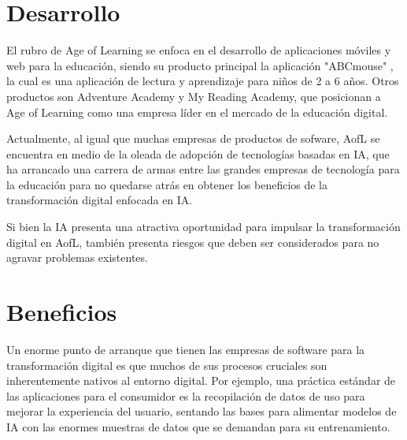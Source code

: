\documentclass[conference]{IEEEtran}
\begin{document}
\section{Desarrollo}
El rubro de Age of Learning se enfoca en el desarrollo de aplicaciones móviles y web para la educación, siendo su producto principal la aplicación "ABCmouse" \cite{ageOfLearningLinkedIn}, la cual es una aplicación de lectura y aprendizaje para niños de 2 a 6 años. Otros productos son Adventure Academy y My Reading Academy, que posicionan a Age of Learning como una empresa líder en el mercado de la educación digital.

Actualmente, al igual que muchas empresas de productos de sofware, AofL se encuentra en medio de la oleada de adopción de tecnologías basadas en IA, que ha arrancado una carrera de armas entre las grandes empresas de tecnología para la educación para no quedarse atrás en obtener los beneficios de la transformación digital enfocada en IA.

Si bien la IA presenta una atractiva oportunidad para impulsar la transformación digital en AofL, también presenta riesgos que deben ser considerados para no agravar problemas existentes. \cite{hoe2022digital}

\section{Beneficios}
Un enorme punto de arranque que tienen las empresas de software para la transformación digital es que muchos de sus procesos cruciales son inherentemente nativos al entorno digital. Por ejemplo, una práctica estándar de las aplicaciones para el consumidor es la recopilación de datos de uso para mejorar la experiencia del usuario, sentando las bases para alimentar modelos de IA con las enormes muestras de datos que se demandan para su entrenamiento. \cite{hoe2022digital}
\end{document}
